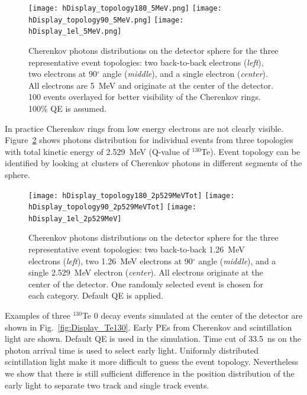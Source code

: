 \begin{figure}[h]
  \centering
  \texttt{[image: hDisplay\_topology180\_5MeV.png]}
  \texttt{[image: hDisplay\_topology90\_5MeV.png]}
  \texttt{[image: hDisplay\_1el\_5MeV.png]}
  \caption{Cherenkov photons distributions on the detector sphere for
    the three representative event topologies: two back-to-back
    electrons (\emph{left}), two electrons at 90$^{\circ}$ angle
    (\emph{middle}), and a single electron (\emph{center}).  All
    electrons are 5~MeV and originate at the center of the
    detector. 100 events overlayed for better visibility of the
    Cherenkov rings. 100\% QE is assumed. }
  \label{fig:Display_top_5MeV}
\end{figure}

In practice Cherenkov rings from low energy electrons are not clearly
visible. Figure~\ref{fig:Display_top_2p5MeV} shows photons
distribution for individual events from three topologies with total
kinetic energy of 2.529~MeV (Q-value of $^{130}$Te). Event topology
can be identified by looking at clusters of Cherenkov photons in
different segments of the sphere.


\begin{figure}[h]
  \centering
  \texttt{[image: hDisplay\_topology180\_2p529MeVTot]}
  \texttt{[image: hDisplay\_topology90\_2p529MeVTot]}
  \texttt{[image: hDisplay\_1el\_2p529MeV]}
  \caption{Cherenkov photons distributions on the detector sphere for
    the three representative event topologies: two back-to-back 1.26~MeV
    electrons (\emph{left}), two 1.26~MeV electrons at 90$^{\circ}$
    angle (\emph{middle}), and a single 2.529~MeV electron
    (\emph{center}).  All electrons originate at the center of the
    detector. One randomly selected event is chosen for each
    category. Default QE is applied.}
  \label{fig:Display_top_2p5MeV}
\end{figure}

Examples of three $^{130}$Te 0{\nbb} decay events simulated at the
center of the detector are shown in
Fig.~\ref{fig:Display_Te130}. Early PEs from Cherenkov and
scintillation light are shown. Default QE is used in the
simulation. Time cut of 33.5~ns on the photon arrival time is used to
select early light. Uniformly distributed scintillation light make it
more difficult to guess the event topology.  Nevertheless we show that
there is still sufficient difference in the position distribution of
the early light to separate two track and single track events.

